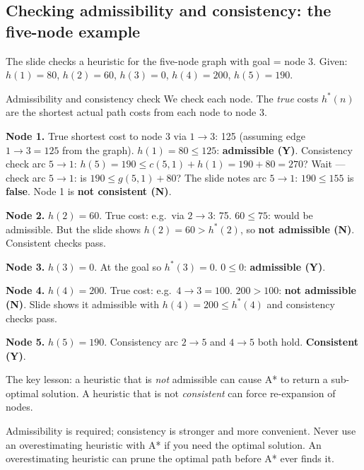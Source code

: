 \documentclass[a4paper,11pt]{article}
\begin{document}
\subsection*{Checking admissibility and consistency: the five-node example}

The slide checks a heuristic for the five-node graph with goal = node 3.
Given: $h(1)=80$, $h(2)=60$, $h(3)=0$, $h(4)=200$, $h(5)=190$.

\begin{worked}{Admissibility and consistency check}
We check each node. The \emph{true} costs $h^*(n)$ are the shortest
actual path costs from each node to node 3.
\begin{steps}
  \item \textbf{Node 1.} True shortest cost to node 3 via $1\to3$: 125
    (assuming edge $1\to3=125$ from the graph).
    $h(1)=80 \le 125$: \textbf{admissible (Y)}.
    Consistency check arc $5\to1$: $h(5)=190 \le c(5,1)+h(1)=190+80=270$?
    Wait --- check arc $5\to1$: is $190 \le g(5,1)+80$? The slide notes
    arc $5\to1$: $190 \le 155$ is \textbf{false}. Node 1 is
    \textbf{not consistent (N)}.
  \item \textbf{Node 2.} $h(2)=60$. True cost: e.g.\ via $2\to3$: 75.
    $60 \le 75$: would be admissible. But the slide shows $h(2)=60 > h^*(2)$,
    so \textbf{not admissible (N)}. Consistent checks pass.
  \item \textbf{Node 3.} $h(3)=0$. At the goal so $h^*(3)=0$. $0\le0$:
    \textbf{admissible (Y)}.
  \item \textbf{Node 4.} $h(4)=200$. True cost: e.g.\ $4\to3=100$.
    $200 > 100$: \textbf{not admissible (N)}. Slide shows it admissible
    with $h(4)=200 \le h^*(4)$ and consistency checks pass.
  \item \textbf{Node 5.} $h(5)=190$. Consistency arc $2\to5$ and $4\to5$
    both hold. \textbf{Consistent (Y)}.
\end{steps}
The key lesson: a heuristic that is \emph{not} admissible can cause A* to
return a sub-optimal solution. A heuristic that is not \emph{consistent} can
force re-expansion of nodes.
\end{worked}

\begin{watchout}
Admissibility is required; consistency is stronger and more convenient.
Never use an overestimating heuristic with A* if you need the optimal solution.
An overestimating heuristic can prune the optimal path before A* ever finds it.
\end{watchout}
\end{document}
